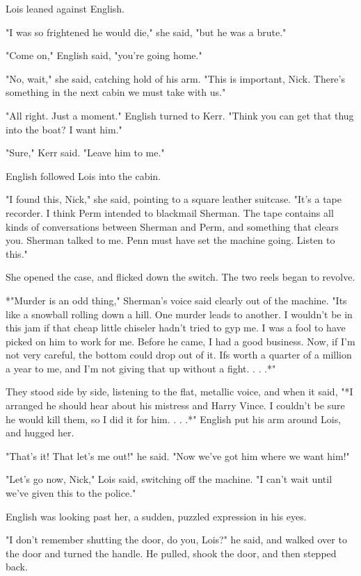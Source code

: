 \documentclass{novel}
\begin{document}
Lois leaned against English.

"I was so frightened he would die," she said, "but he was a brute."

"Come on," English said, "you're going home."

"No, wait," she said, catching hold of his arm. "This is important, Nick. There's something in the next cabin we must take with us."

"All right. Just a moment." English turned to Kerr. "Think you can get that thug into the boat? I want him."

"Sure," Kerr said. "Leave him to me."

English followed Lois into the cabin.

"I found this, Nick," she said, pointing to a square leather suitcase. "It's a tape recorder. I think Perm intended to blackmail Sherman. The tape contains all kinds of conversations between Sherman and Perm, and something that clears you. Sherman talked to me. Penn must have set the machine going. Listen to this."

She opened the case, and flicked down the switch. The two reels began to revolve.

*"Murder is an odd thing," Sherman's voice said clearly out of the machine. "Its like a snowball rolling down a hill. One murder leads to another. I wouldn't be in this jam if that cheap little chiseler hadn't tried to gyp me. I was a fool to have picked on him to work for me. Before he came, I had a good business. Now, if I'm not very careful, the bottom could drop out of it. Ifs worth a quarter of a million a year to me, and I'm not giving that up without a fight. . . .*"

They stood side by side, listening to the flat, metallic voice, and when it said, "*I arranged he should hear about his mistress and Harry Vince. I couldn't be sure he would kill them, so I did it for him. . . .*" English put his arm around Lois, and hugged her.

"That's it! That let's me out!" he said. "Now we've got him where we want him!"

"Let's go now, Nick," Lois said, switching off the machine. "I can't wait until we've given this to the police."

English was looking past her, a sudden, puzzled expression in his eyes.

"I don't remember shutting the door, do you, Lois?" he said, and walked over to the door and turned the handle. He pulled, shook the door, and then stepped back.
\end{document}
